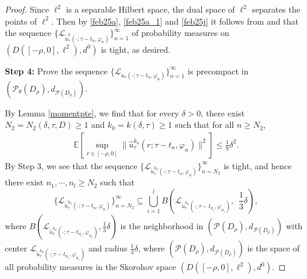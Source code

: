 \documentclass[11pt]{article}
\numberwithin{equation}{section}
\theoremstyle{plain}
\def\be{\begin{equation}}
\def\ee{\end{equation}}
\begin{document}
\begin{proof}
 
 Since $\ell^2$ is
 a
  separable Hilbert space, the dual space 
  of $\ell^2$ separates the points of $\ell^2$.
  Then by \eqref{feb25a},
  \eqref{feb25a_1}
  and \eqref{feb25j}
  it follows from   \cite[Theorem 3.1]{J1986AIHP} and \cite[Theorem 1]{A1978AOP}  that 
  the sequence 
  $\{ \mathcal{L}_{
 \widetilde{u}^k_\tau
                (\cdot; \tau -t_n,
             \varphi_n  )
 }\}_{n=1}^\infty$
 of probability measures
 on $(D([-\rho, 0],
 \ell^2), d^0)$ 
 is  tight,
 as desired.
  
 
 
  {\bf Step 4:} Prove  the sequence 
 $\{ \mathcal{L}_{
  {u}_\tau
                (\cdot; \tau -t_n,
             \varphi_n  )
 }\}_{n=1}^\infty$
 is precompact
 in $ (\mathcal{P}_\theta
 (D_\rho), d_{
 \mathcal{P}
 (D_\rho)
 })$.
 
     By 
  Lemma \ref{momentpte},  we 
  find   that
  for every  
  $\delta>0$,  
 there exist 
       $N_2 = N_2(\delta , \tau, D)  \ge 1$ 
 and 
      $k_{0} = k(\delta , \tau) \ge 1$
 such that for all $n \ge N_2$,
 \begin{align}\label{feb26a2}
    \mathbb{E}
       \left[ \sup_{r \in [-\rho,0]}
                    \| \widehat{u}_\tau^{k_{0} }(r; \tau-t_n, \varphi_n) \|^2
       \right]
    \le {\frac   19} \delta^2  .
 \end{align}
    By Step 3,
      we see that the sequence
  $\{ \mathcal{L}_{
 \widetilde{u}^{k_0}_\tau
                (\cdot; \tau -t_n,
             \varphi_n  )
 }\}_{n= N_2}^\infty$
 is tight, and hence  
   there exist
 $n_1,\cdots , n_l\ge N_2$ such that
 \be\label{feb26a3}
 \{ \mathcal{L}_{
 \widetilde{u}^{k_0}_\tau
                (\cdot; \tau -t_n,
             \varphi_n  )
 }\}_{n= N_2}^\infty
 \subseteq
\bigcup_{i=1}^{l}
 B\left (
 \mathcal{L}_{
 \widetilde{u}^{k_0}_\tau
                (\cdot; \tau -t_{n_i},
             \varphi_{n_i}  )},\ 
 \ {\frac 13} \delta
 \right ),
 \ee
where
$B  (
 \mathcal{L}_{
 \widetilde{u}^{k_0}_\tau
                (\cdot; \tau -t_{n_i},
             \varphi_{n_i}  )},
   {\frac 13} \delta
   )
  $ is the neighborhood in
    $ (\mathcal{P}
 (D_\rho), d_{
 \mathcal{P}
 (D_\rho)
 })$
    with center 
 $\mathcal{L}_{
 \widetilde{u}^{k_0}_\tau
                (\cdot; \tau -t_{n_i},
             \varphi_{n_i}  )}$
             and  
             radius 
             ${\frac 13} \delta$, where
               $ (\mathcal{P}
 (D_\rho), d_{
 \mathcal{P}
 (D_\rho)
 })$
 is the space of
 all probability measures
 in 
  the Skorohov space $(D([-\rho, 0],
 \ell^2), d^0)$.
 

\end{proof}
\end{document}
